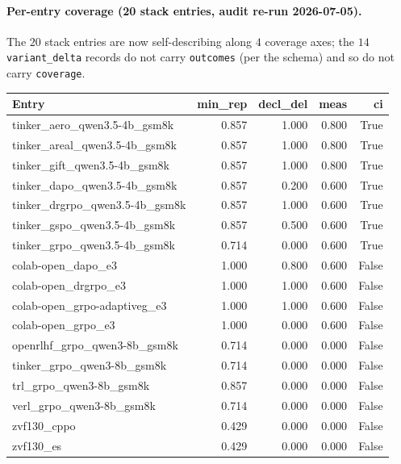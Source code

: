 \paragraph{Per-entry coverage (20 stack entries, audit re-run 2026-07-05).}
The $20$ stack entries are now self-describing along $4$ coverage
axes; the $14$ \texttt{variant\_delta} records do not carry
\texttt{outcomes} (per the schema) and so do not carry
\texttt{coverage}.

\begin{table}[h]
\centering
\small
\begin{tabular}{lrrrr}
\toprule
\textbf{Entry} & \textbf{min\_rep} & \textbf{decl\_del} & \textbf{meas} & \textbf{ci} \\
\midrule
tinker\_aero\_qwen3.5-4b\_gsm8k     & 0.857 & 1.000 & 0.800 & True \\
tinker\_areal\_qwen3.5-4b\_gsm8k    & 0.857 & 1.000 & 0.800 & True \\
tinker\_gift\_qwen3.5-4b\_gsm8k     & 0.857 & 1.000 & 0.800 & True \\
tinker\_dapo\_qwen3.5-4b\_gsm8k     & 0.857 & 0.200 & 0.600 & True \\
tinker\_drgrpo\_qwen3.5-4b\_gsm8k   & 0.857 & 1.000 & 0.600 & True \\
tinker\_gspo\_qwen3.5-4b\_gsm8k     & 0.857 & 0.500 & 0.600 & True \\
tinker\_grpo\_qwen3.5-4b\_gsm8k    & 0.714 & 0.000 & 0.600 & True \\
colab-open\_dapo\_e3                & 1.000 & 0.800 & 0.600 & False \\
colab-open\_drgrpo\_e3              & 1.000 & 1.000 & 0.600 & False \\
colab-open\_grpo-adaptiveg\_e3      & 1.000 & 1.000 & 0.600 & False \\
colab-open\_grpo\_e3                & 1.000 & 0.000 & 0.600 & False \\
openrlhf\_grpo\_qwen3-8b\_gsm8k     & 0.714 & 0.000 & 0.000 & False \\
tinker\_grpo\_qwen3-8b\_gsm8k       & 0.714 & 0.000 & 0.000 & False \\
trl\_grpo\_qwen3-8b\_gsm8k          & 0.857 & 0.000 & 0.000 & False \\
verl\_grpo\_qwen3-8b\_gsm8k         & 0.714 & 0.000 & 0.000 & False \\
zvf130\_cppo                        & 0.429 & 0.000 & 0.000 & False \\
zvf130\_es                          & 0.429 & 0.000 & 0.000 & False \\

\end{tabular}
\end{table}

